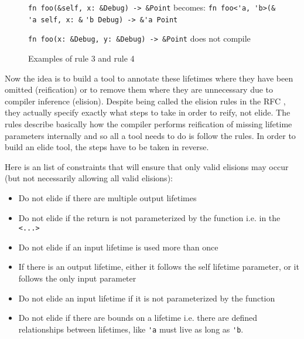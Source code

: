 \begin{figure}
{\verb|fn foo(&self, x: &Debug) -> &Point|}\newline
becomes:\newline
{\verb|fn foo<'a, 'b>(&|}
{\color{green} \verb|'a|}{\verb| self, x: &|}{\color{red} \verb|'b|}{\verb| Debug) -> &|}{\color{blue}\verb|'a|}{\verb| Point|}


\vspace{4mm}
{\verb|fn foo(x: &Debug, y: &Debug) -> &Point|}\newline
does not compile

\caption{Examples of rule 3 and rule 4}
\label{Fig:lifetimes4}
\end{figure}

Now the idea is to build a tool to annotate these lifetimes where they have been omitted (reification) or to remove them where they are unnecessary due to compiler inference (elision). Despite being called the elision rules in the RFC \cite{elisionrules}, they actually specify exactly what steps to take in order to reify, not elide. The rules describe basically how the compiler performs reification of missing lifetime parameters internally and so all a tool needs to do is follow the rules. In order to build an elide tool, the steps have to be taken in reverse.


Here is an list of constraints that will ensure that only valid elisions may occur (but not necessarily allowing all valid elisions):
\begin{itemize}
\item Do not elide if there are multiple output lifetimes
\item Do not elide if the return is not parameterized by the function i.e. in the {\verb|<...>|}
\item Do not elide if an input lifetime is used more than once
\item If there is an output lifetime, either it follows the self lifetime parameter, or it follows the only input parameter
\item Do not elide an input lifetime if it is not parameterized by the function
\item Do not elide if there are bounds on a lifetime i.e. there are defined relationships between lifetimes, like {\verb|'a|} must live as long as {\verb|'b|}.
\end{itemize}

